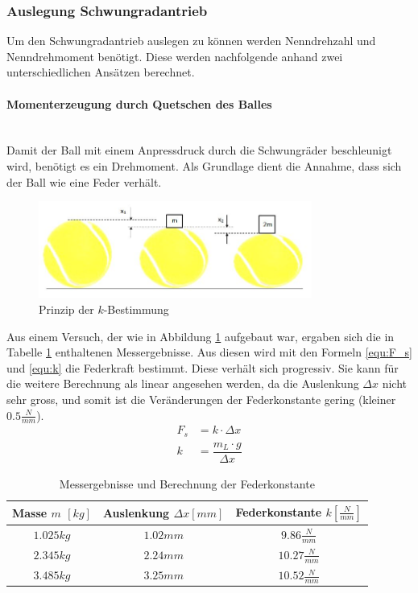 \subsubsection{Auslegung Schwungradantrieb}
\label{BestimmungDrehmomentSchwundrad}
Um den Schwungradantrieb auslegen zu können werden Nenndrehzahl und Nenndrehmoment 
benötigt. Diese werden nachfolgende anhand zwei unterschiedlichen Ansätzen berechnet.
%
\paragraph{Momenterzeugung durch Quetschen des Balles}$~~$\vspace{2mm}\\
Damit der Ball mit einem Anpressdruck durch die Schwungräder beschleunigt 
wird, benötigt es ein Drehmoment. Als Grundlage dient die Annahme, dass sich der 
Ball wie eine Feder verhält.

\begin{figure}[h!]
	\centering
	\includegraphics[width=0.8\textwidth]
	{Enddokumentation/Anhang/Bilder/KompressionBaelle.jpg}
	\caption{Prinzip der $k$-Bestimmung}
	\label{fig:BallKomp}
\end{figure}

Aus einem Versuch, der wie in Abbildung \ref{fig:BallKomp} aufgebaut war, ergaben sich die in Tabelle \ref{tab:BallKompErgebnis} enthaltenen Messergebnisse. Aus diesen wird mit den Formeln \ref{equ:F_s} und \ref{equ:k} die Federkraft bestimmt. Diese verhält sich progressiv. Sie kann für die weitere Berechnung als linear angesehen werden, da die Auslenkung $\Delta x$ nicht sehr gross, und somit ist die Veränderungen der Federkonstante gering (kleiner $0.5 \frac{N}{mm}$).
\begin{align}  
    F_s &= k \cdot \Delta x 
    \label{equ:F_s}\\
    k &= \dfrac{m_L \cdot g}{\Delta x}
    \label{equ:k}
\end{align}
\begin{table}[h!]
	\begin{tabular}{ccc}
		\rule{0pt}{11pt} Masse $m$ $\left[kg\right]$ & Auslenkung $\Delta x 
		\left[mm\right]$ & Federkonstante $k \left[\frac{N}{mm}\right]$\\
		\hline
		\rule{0pt}{11pt} $1.025 kg$ & $1.02 mm$ & $9.86  \frac{N}{mm}$\\
		\rule{0pt}{11pt} $2.345 kg$ & $2.24 mm$ & $10.27 \frac{N}{mm}$\\
		\rule{0pt}{11pt} $3.485 kg$ & $3.25 mm$ & $10.52 \frac{N}{mm}$\\
	\end{tabular}
	\centering
	\caption{Messergebnisse und Berechnung der Federkonstante}
	\label{tab:BallKompErgebnis}
\end{table}

